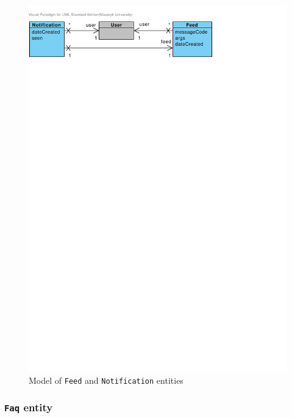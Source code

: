 \begin{figure}[h]
    \centering
        \includegraphics[trim=0 720 170 30, clip, keepaspectratio, width=\textwidth]{./images/domain-feed-notification-entities.pdf}
    \caption{Model of \texttt{Feed} and \texttt{Notification} entities}
    \label{fig:domain-feed-notification-entities}
\end{figure}

\subsubsection{\texttt{Faq} entity}

\faketext[1]

